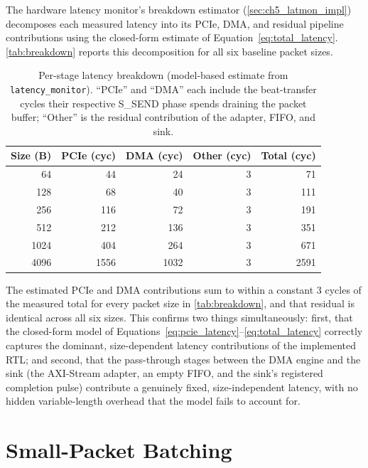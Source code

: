 The hardware latency monitor's breakdown estimator (\autoref{sec:ch5_latmon_impl}) decomposes each measured latency into its PCIe, DMA, and residual pipeline contributions using the closed-form estimate of Equation~\ref{eq:total_latency}. \autoref{tab:breakdown} reports this decomposition for all six baseline packet sizes.

\begin{table}[htbp]
\centering
\begin{tabular}{@{}rrrrr@{}}
\toprule
\textbf{Size (B)} & \textbf{PCIe (cyc)} & \textbf{DMA (cyc)} & \textbf{Other (cyc)} & \textbf{Total (cyc)} \\
\midrule
64   & 44   & 24   & 3 & 71   \\
128  & 68   & 40   & 3 & 111  \\
256  & 116  & 72   & 3 & 191  \\
512  & 212  & 136  & 3 & 351  \\
1024 & 404  & 264  & 3 & 671  \\
4096 & 1556 & 1032 & 3 & 2591 \\
\bottomrule
\end{tabular}
\caption{Per-stage latency breakdown (model-based estimate from \texttt{latency\_monitor}). ``PCIe'' and ``DMA'' each include the beat-transfer cycles their respective S\_SEND phase spends draining the packet buffer; ``Other'' is the residual contribution of the adapter, FIFO, and sink.}
\label{tab:breakdown}
\end{table}

The estimated PCIe and DMA contributions sum to within a constant 3 cycles of the measured total for every packet size in \autoref{tab:breakdown}, and that residual is identical across all six sizes. This confirms two things simultaneously: first, that the closed-form model of Equations~\ref{eq:pcie_latency}--\ref{eq:total_latency} correctly captures the dominant, size-dependent latency contributions of the implemented RTL; and second, that the pass-through stages between the DMA engine and the sink (the AXI-Stream adapter, an empty FIFO, and the sink's registered completion pulse) contribute a genuinely fixed, size-independent latency, with no hidden variable-length overhead that the model fails to account for.


\section{Small-Packet Batching}
\label{sec:ch7_batching}

